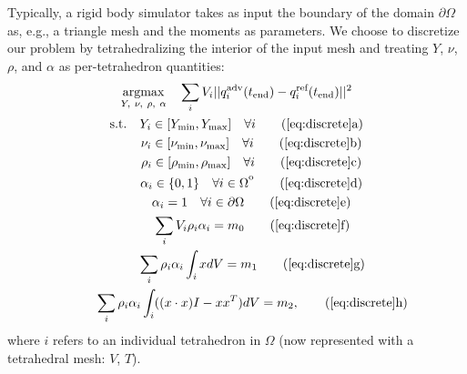 
Typically, a rigid body simulator takes as input the boundary of the domain $\partial \Omega$ as, e.g., a triangle mesh and the moments as parameters. We choose to discretize our problem by tetrahedralizing the interior of the input mesh and treating $Y$, $\nu$, $\rho$, and $\alpha$ as per-tetrahedron quantities:
\begin{gather}
\underset{Y,\ \nu,\ \rho,\ \alpha}{\mathrm{argmax}} \quad  \sum_i V_i || q_i^\text{adv}(t_\text{end}) -  q_i^\text{ref}(t_\text{end}) ||^2  \label{eq:discrete} \\
\text{s.t.}\quad                    Y_i \in [Y_\text{min}, Y_\text{max}]\quad \forall i  \tag{\ref{eq:discrete}a} \\
\phantom{\text{s.t.}}\quad   \nu_i \in [\nu_\text{min}, \nu_\text{max}] \quad \forall i   \tag{\ref{eq:discrete}b} \\
\phantom{\text{s.t.}}\quad   \rho_i \in [\rho_\text{min}, \rho_\text{max}] \quad \forall i  \tag{\ref{eq:discrete}c} \\
\phantom{\text{s.t.}}\quad   \alpha_i \in \{0, 1\} \quad \forall i \in \Omega\strut^\mathrm{o} \tag{\ref{eq:discrete}d} \\
\phantom{\text{s.t.}}\quad   \alpha_i = 1 \quad \forall i \in \partial \Omega  \tag{\ref{eq:discrete}e} \\
\phantom{\text{s.t.}}\quad   \sum_i V_i \rho_i \alpha_i = m_0 \tag{\ref{eq:discrete}f} \\
\phantom{\text{s.t.}}\quad   \sum_i \rho_i \alpha_i \int_i x dV = m_1 \tag{\ref{eq:discrete}g} \\
\phantom{\text{s.t.}}\quad   \sum_i \rho_i \alpha_i \int_i ((x \cdot x)I - xx^T) dV = m_2, \tag{\ref{eq:discrete}h}
\end{gather}
where $i$ refers to an individual tetrahedron in $\Omega$ (now represented with a tetrahedral mesh: $V$, $T$).
